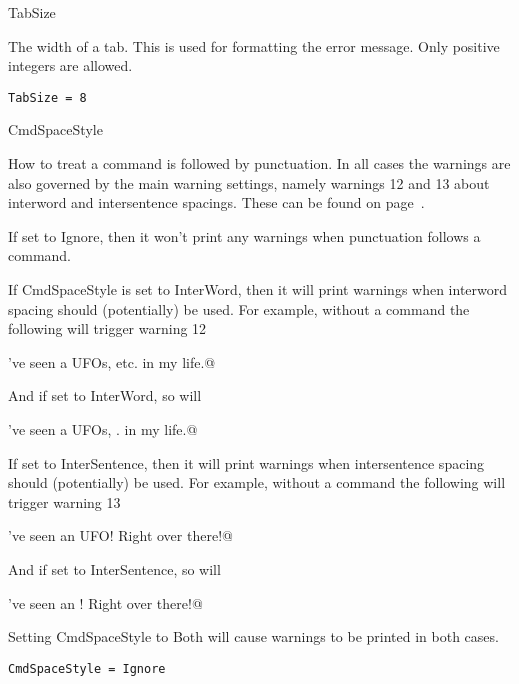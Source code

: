 \begin{chktexrcsimplevar}{TabSize}

The width of a tab.  This is used for formatting the error message.
Only positive integers are allowed.

\chktexrcdefault\begin{verbatim}
TabSize = 8
\end{verbatim}
\end{chktexrcsimplevar}


\medskip
\begin{chktexrcsimplevar}{CmdSpaceStyle}

How to treat a command is followed by punctuation.  In all cases the
warnings are also governed by the main warning settings, namely
warnings 12 and 13 about interword and intersentence spacings.
These can be found on page~\pageref{warn:interword}.

If set to Ignore, then it won't print any warnings when punctuation
follows a command.


If CmdSpaceStyle is set to InterWord, then it will print warnings
when interword spacing should (potentially) be used.  For example,
without a command the following will trigger warning 12

\begin{errexam}
\verb@I've seen a UFOs, etc. in my life.@
\end{errexam}

And if set to InterWord, so will

\begin{errexam}
\verb@I've seen a UFOs, \etc. in my life.@
\end{errexam}


If set to InterSentence, then it will print warnings when
intersentence spacing should (potentially) be used.  For example,
without a command the following will trigger warning 13

\begin{errexam}
\verb@I've seen an UFO! Right over there!@
\end{errexam}

And if set to InterSentence, so will

\begin{errexam}
\verb@I've seen an \UFO! Right over there!@
\end{errexam}


Setting CmdSpaceStyle to Both will cause warnings to be printed in
both cases.

\chktexrcdefault\begin{verbatim}
CmdSpaceStyle = Ignore
\end{verbatim}
\end{chktexrcsimplevar}


